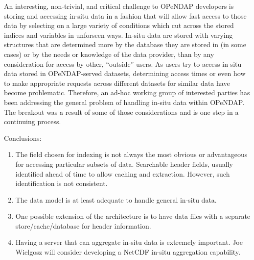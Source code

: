An interesting, non-trivial, and critical challenge to \ac{OPeNDAP} developers
is storing and accessing in-situ data in a fashion that will allow
fast access to those data by selecting on a large variety of
conditions which cut across the stored indices and variables
in unforseen ways.  In-situ data are stored with varying structures
that are determined more by the database they are stored in (in some
cases) or by the needs or knowledge of the data provider, than by
any consideration for access by other, ``outside'' users.  As users
try to access in-situ data stored in \ac{OPeNDAP}-served datasets,
determining access times or even how to make appropriate requests
across different datasets for similar data have become problematic.
Therefore, an ad-hoc working group of interested parties has been
addressing the general problem of handling in-situ data within
\ac{OPeNDAP}.  The breakout was a result of some of those considerations
and is one step in a continuing process.

Conclusions:

\begin{enumerate}
 \item The field chosen for indexing is not always the most obvious or
advantageous for accessing particular subsets of data.  Searchable
header fields, usually identified ahead of time to allow caching
and extraction.  However, such identification is not consistent.

 \item The data model is at least adequate to handle general in-situ
data.  

 \item One possible extension of the architecture is to have data files
with a separate store/cache/database for header information.

 \item Having a server that can aggregate in-situ data is extremely
important.  Joe Wielgosz will consider developing a \ac{NetCDF}
in-situ aggregation capability.
\end{enumerate}

%
%
%
%

